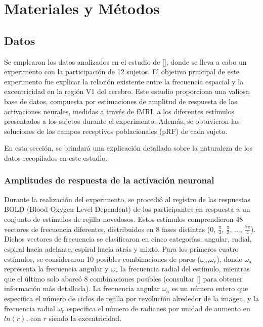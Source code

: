 \chapter{Materiales y M\'etodos}\label{chapter:materials_and_methods}


\section{Datos}

Se emplearon los datos analizados en el estudio de [\cite{broderick_mapping_2022}], donde se lleva a cabo un experimento con la participación de 12 sujetos. El objetivo principal de este experimento fue explicar la relación existente entre la frecuencia espacial y la excentricidad en la región V1 del cerebro. Este estudio proporciona una valiosa base de datos, compuesta por estimaciones de amplitud de respuesta de las activaciones neurales, medidas a trav\'es de fMRI, a los diferentes estímulos presentados a los sujetos durante el experimento. Además, se obtuvieron las soluciones de los campos receptivos poblacionales (pRF) de cada sujeto.

En esta sección, se brindará una explicación detallada sobre la naturaleza de los datos recopilados en este estudio.

\subsection{Amplitudes de respuesta de la activaci\'on neuronal}

Durante la realización del experimento, se procedió al registro de las respuestas BOLD (Blood Oxygen Level Dependent) de los participantes en respuesta a un conjunto de est\'imulos de rejilla novedosos. Estos estímulos comprendieron 48 vectores de frecuencia diferentes, distribuidos en 8 fases distintas (0, $\frac{\pi}{4}$, $\frac{\pi}{2}$, ..., $\frac{7\pi}{4}$). Dichos vectores de frecuencia se clasificaron en cinco categorías: angular, radial, espiral hacia adelante, espiral hacia atrás y mixto. Para los primeros cuatro estímulos, se consideraron 10 posibles combinaciones de pares ($\omega_a$,$\omega_r$), donde $\omega_a$ representa la frecuencia angular y $\omega_r$ la frecuencia radial del estímulo, mientras que el último solo abarcó 8 combinaciones posibles (consultar [\cite{broderick_mapping_2022}] para obtener información más detallada). La frecuencia angular $\omega_a$ es un número entero que especifica el número de ciclos de rejilla por revolución alrededor de la imagen, y la frecuencia radial $\omega_r$ especifica el número de radianes por unidad de aumento en $ln(r)$, con $r$ siendo la excentricidad.

